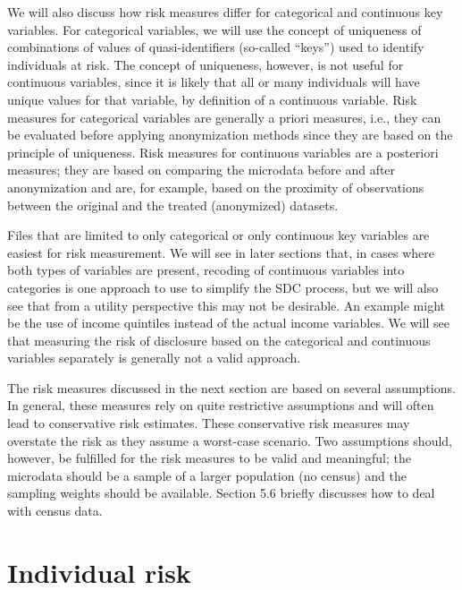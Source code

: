 \documentclass[letterpaper,10pt,english]{sphinxmanual}
\begin{document}
We will also discuss how risk measures differ for categorical and
continuous key variables. For categorical variables, we will use the
concept of uniqueness of combinations of values of quasi-identifiers
(so-called “keys”) used to identify individuals at risk. The concept of
uniqueness, however, is not useful for continuous variables, since it is
likely that all or many individuals will have unique values for that
variable, by definition of a continuous variable. Risk measures for
categorical variables are generally a priori measures, i.e., they can be
evaluated before applying anonymization methods since they are based on
the principle of uniqueness. Risk measures for continuous variables are
a posteriori measures; they are based on comparing the microdata before
and after anonymization and are, for example, based on the proximity of
observations between the original and the treated (anonymized) datasets.

Files that are limited to only categorical or only continuous key
variables are easiest for risk measurement. We will see in later
sections that, in cases where both types of variables are present,
recoding of continuous variables into categories is one approach to use
to simplify the SDC process, but we will also see that from a utility
perspective this may not be desirable. An example might be the use of
income quintiles instead of the actual income variables. We will see
that measuring the risk of disclosure based on the categorical and
continuous variables separately is generally not a valid approach.

The risk measures discussed in the next section are based on several
assumptions. In general, these measures rely on quite restrictive
assumptions and will often lead to conservative risk estimates. These
conservative risk measures may overstate the risk as they assume a
worst-case scenario. Two assumptions should, however, be fulfilled for
the risk measures to be valid and meaningful; the microdata should be a
sample of a larger population (no census) and the sampling weights
should be available. Section 5.6 briefly discusses how to deal with
census data.


\section{Individual risk}
\label{\detokenize{measure_risk:individual-risk}}
\end{document}
